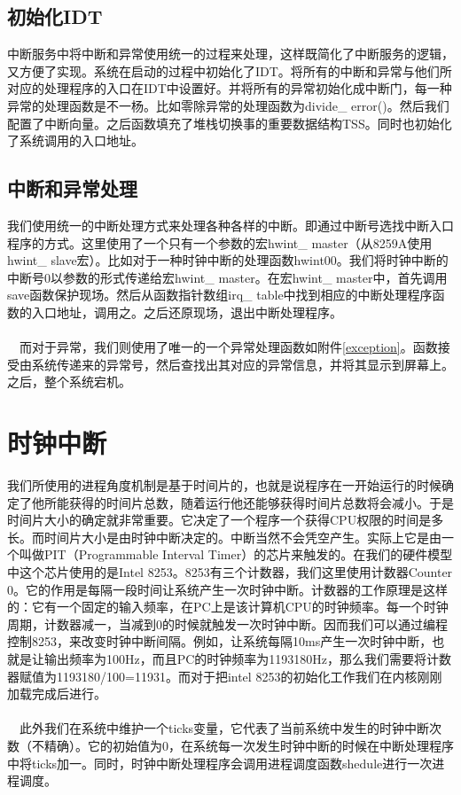 \documentclass[UTF8,nofonts,cs4size]{ctexrep}
\begin{document}
\subsection{初始化IDT}
中断服务中将中断和异常使用统一的过程来处理，这样既简化了中断服务的逻辑，又方便了实现。系统在启动的过程中初始化了IDT。将所有的中断和异常与他们所对应的处理程序的入口在IDT中设置好。并将所有的异常初始化成中断门，每一种异常的处理函数是不一杨。比如零除异常的处理函数为divide\_ error()。然后我们配置了中断向量。之后函数填充了堆栈切换事的重要数据结构TSS。同时也初始化了系统调用的入口地址。
\subsection{中断和异常处理}
我们使用统一的中断处理方式来处理各种各样的中断。即通过中断号选找中断入口程序的方式。这里使用了一个只有一个参数的宏hwint\_ master（从8259A使用hwint\_ slave宏）。比如对于一种时钟中断的处理函数hwint00。我们将时钟中断的中断号0以参数的形式传递给宏hwint\_ master。在宏hwint\_ master中，首先调用save函数保护现场。然后从函数指针数组irq\_ table中找到相应的中断处理程序函数的入口地址，调用之。之后还原现场，退出中断处理程序。
\paragraph{}
\indent \ \ 而对于异常，我们则使用了唯一的一个异常处理函数如附件\ref{exception}。函数接受由系统传递来的异常号，然后查找出其对应的异常信息，并将其显示到屏幕上。之后，整个系统宕机。
\section{时钟中断}
我们所使用的进程角度机制是基于时间片的，也就是说程序在一开始运行的时候确定了他所能获得的时间片总数，随着运行他还能够获得时间片总数将会减小。于是时间片大小的确定就非常重要。它决定了一个程序一个获得CPU权限的时间是多长。而时间片大小是由时钟中断决定的。中断当然不会凭空产生。实际上它是由一个叫做PIT（Programmable Interval Timer）的芯片来触发的。在我们的硬件模型中这个芯片使用的是Intel 8253。8253有三个计数器，我们这里使用计数器Counter 0。它的作用是每隔一段时间让系统产生一次时钟中断。计数器的工作原理是这样的：它有一个固定的输入频率，在PC上是该计算机CPU的时钟频率。每一个时钟周期，计数器减一，当减到0的时候就触发一次时钟中断。因而我们可以通过编程控制8253，来改变时钟中断间隔。例如，让系统每隔10ms产生一次时钟中断，也就是让输出频率为100Hz，而且PC的时钟频率为1193180Hz，那么我们需要将计数器赋值为1193180/100=11931。而对于把intel 8253的初始化工作我们在内核刚刚加载完成后进行。
\paragraph{}
\indent \ \ 
此外我们在系统中维护一个ticks变量，它代表了当前系统中发生的时钟中断次数（不精确）。它的初始值为0，在系统每一次发生时钟中断的时候在中断处理程序中将ticks加一。同时，时钟中断处理程序会调用进程调度函数shedule进行一次进程调度。
\end{document}
